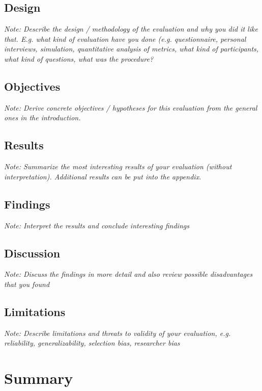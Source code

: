 \documentclass[a4paper,12pt,twoside]{report}
\begin{document}
\section{Design}

\textit{Note: Describe the design / methodology of the evaluation and why you did it like that. E.g. what kind of evaluation have you done (e.g. questionnaire, personal interviews, simulation, quantitative analysis of metrics, what kind of participants, what kind of questions, what was the procedure?}

\section{Objectives}

\textit{Note: Derive concrete objectives / hypotheses for this evaluation from the general ones in the introduction.}

\section{Results}

\textit{Note: Summarize the most interesting results of your evaluation (without interpretation). Additional results can be put into the appendix.}

\section{Findings}

\textit{Note: Interpret the results and conclude interesting findings}

\section{Discussion}

\textit{Note: Discuss the findings in more detail and also review possible disadvantages that you found}

\section{Limitations}

\textit{Note: Describe limitations and threats to validity of your evaluation, e.g. reliability, generalizability, selection bias, researcher bias}




\chapter{Summary}
\end{document}
